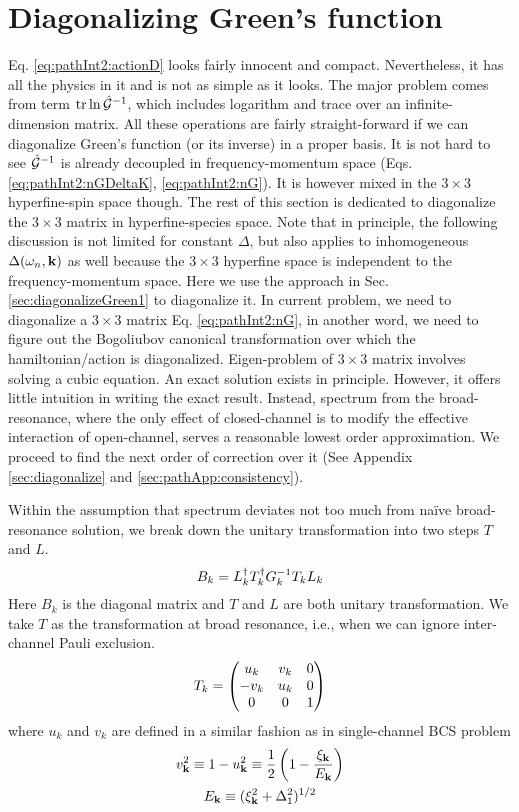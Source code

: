 \section{Diagonalizing Green's function\label{sec:diagonalGreen}}
Eq. \eqref{eq:pathInt2:actionD} looks fairly innocent and compact.  Nevertheless, it has all the physics in it and is not as simple as it looks.  The major problem comes from term $\text{tr}\ln\hat{\mathcal{G}}^{-1}$, which includes  logarithm and trace over an infinite-dimension matrix.   All these operations are fairly straight-forward if we can diagonalize  Green's function (or its inverse) in a proper basis.      It is not hard to see $\hat{\mathcal{G}}^{-1}$ is already decoupled in frequency-momentum space (Eqs.  \ref{eq:pathInt2:nGDeltaK}, \ref{eq:pathInt2:nG}).  It is however mixed in the $3\times3$ hyperfine-spin space though.  The rest of this section is dedicated to diagonalize the $3\times3$ matrix in hyperfine-species space.  Note that in principle, the following discussion is not limited for constant $\Delta$, but also applies to inhomogeneous $\Delta(\omega_{n},\mathbf{k})$ as well because the $3\times3$ hyperfine space is independent to the frequency-momentum space.   Here we use the approach in Sec. \ref{sec:diagonalizeGreen1} to diagonalize it.   
In current problem, we need to diagonalize a $3\times3$ matrix Eq. \ref{eq:pathInt2:nG}, in another word, we need to figure out the Bogoliubov canonical transformation over which the hamiltonian/action is diagonalized.   Eigen-problem of $3\times3$ matrix involves solving a cubic equation. An exact solution exists in principle.  However,  it offers little intuition in writing the exact result. Instead,  spectrum from the broad-resonance, where the only effect of closed-channel is to modify the effective interaction of open-channel, serves a reasonable lowest order approximation. We proceed to find the next order of correction over it (See Appendix \ref{sec:diagonalize} and \ref{sec:pathApp:consistency}). 


Within the assumption that spectrum  deviates not too much from na\"{i}ve broad-resonance solution, we  break down the unitary transformation into two steps $T$ and $L$. 
\begin{equation}\label{eq:pathInt2:B}
B_k=L_k^{\dagger}T_k^{\dagger}G_k^{-1}T_kL_k
\end{equation} 
Here $B_{k}$ is the diagonal matrix and $T$ and $L$ are both unitary transformation.  We take $T$ as the transformation at broad resonance, i.e., when we can ignore inter-channel Pauli exclusion. 
\begin{equation}\label{eq:pathInt2:T}
T_k=\begin{pmatrix}u_k&v_k&0\\-v_k&u_k&0\\0&0&1\end{pmatrix}
\end{equation}
where $u_{k}$ and $v_{k}$ are defined in a similar fashion as in single-channel BCS  problem
\begin{gather}
v_{\mathbf{k}}^{2}\equiv1-u_{\mathbf{k}}^{2}\equiv\frac{1}{2}\left(1-\frac{\xi_{\mathbf{k}}}{E_{\mathbf{k}}}\right)\\
E_{\mathbf{k}}\equiv(\xi_{\mathbf{k}}^{2}+\Delta_{1}^{2})^{1/2}
\end{gather}


